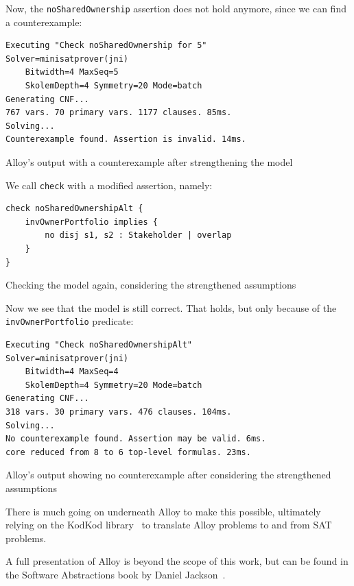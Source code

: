 Now, the \verb|noSharedOwnership| assertion does not hold anymore, since we can find a counterexample:

\begin{listing}[H]\label{lst:alloy-strengthen-output}
	\begin{verbatim}
Executing "Check noSharedOwnership for 5"
Solver=minisatprover(jni) 
    Bitwidth=4 MaxSeq=5 
    SkolemDepth=4 Symmetry=20 Mode=batch
Generating CNF...
767 vars. 70 primary vars. 1177 clauses. 85ms.
Solving...
Counterexample found. Assertion is invalid. 14ms.
\end{verbatim}
	\caption{Alloy's output with a counterexample after strengthening the model}
\end{listing}

We call \verb|check| with a modified assertion, namely:

\begin{listing}[H]\label{lst:alloy-strengthen-check}
	\begin{verbatim}
check noSharedOwnershipAlt {
    invOwnerPortfolio implies {
        no disj s1, s2 : Stakeholder | overlap
    }
}
\end{verbatim}
	\caption{Checking the model again, considering the strengthened assumptions}
\end{listing}

\newpage

Now we see that the model is still correct. That holds, but only because of the \verb|invOwnerPortfolio| predicate:

\begin{listing}[H]\label{lst:alloy-strengthen-check-output}
	\begin{verbatim}
Executing "Check noSharedOwnershipAlt"
Solver=minisatprover(jni) 
    Bitwidth=4 MaxSeq=4 
    SkolemDepth=4 Symmetry=20 Mode=batch
Generating CNF...
318 vars. 30 primary vars. 476 clauses. 104ms.
Solving...
No counterexample found. Assertion may be valid. 6ms.
core reduced from 8 to 6 top-level formulas. 23ms.
\end{verbatim}
	\caption{Alloy's output showing no counterexample after considering the strengthened assumptions}
\end{listing}

There is much going on underneath Alloy to make this possible, ultimately relying on the KodKod library~\cite{TorlakJackson2007} to translate Alloy problems to and from SAT problems.

A full presentation of Alloy is beyond the scope of this work, but can be found in the Software Abstractions book by Daniel Jackson~\cite{jackson-2012}.

